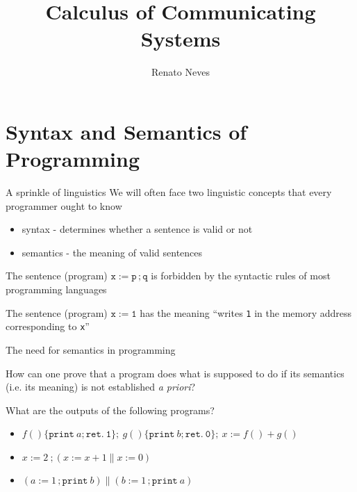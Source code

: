 \documentclass{beamer}
\author[Renato Neves]{Renato Neves}
\date{}
\begin{document}
\title{Calculus of Communicating Systems}

\frame[plain]{\titlepage}

\section{Syntax and Semantics of Programming}

\begin{frame}{A sprinkle of linguistics}
  We will often face two linguistic concepts that every programmer
  ought to know
  \begin{itemize}
  \item syntax - determines whether a sentence
    is valid or not
  \item semantics - the meaning of valid sentences
  \end{itemize}

  \vfill
  \begin{example}[syntax]
      The sentence (program) $\mathtt{x := p\, ;q}$ is forbidden by
      the syntactic rules of most programming languages
    \end{example}
  \begin{example}[semantics]
      The sentence (program) $\mathtt{x := 1}$ has the meaning ``writes
      \texttt{1} in the memory address corresponding to \texttt{x}''
  \end{example}
\end{frame}

\begin{frame}{The need for semantics in programming}

  How can one prove that a program does what is supposed to do if its
  semantics (i.e. its meaning) is not established \emph{a priori}?

  \vfill
  \begin{examples}
    What are the outputs of the following programs?
    \begin{itemize}
            \item $f()\{ \mathtt{print}\ a; \mathtt{ret.\ 1} \} ;\
                g()\{ \mathtt{print}\ b; \mathtt{ret.\ 0} \};\
                x:= f() + g()$ 
            \item $x:=2\ ; (x := x + 1 \parallel  x := 0)$ 
            \item $(a:= 1\, ; \mathtt{print}\ b) \parallel 
                    (b:= 1\, ; \mathtt{print}\ a)$ 
    \end{itemize}
  \end{examples}

\end{frame}
\end{document}
